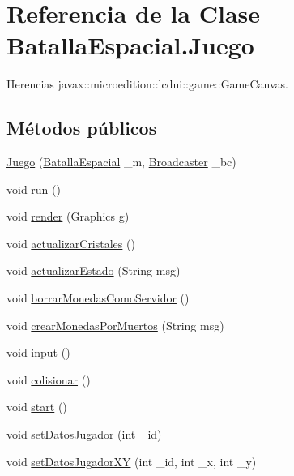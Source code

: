 \hypertarget{classBatallaEspacial_1_1Juego}{
\section{Referencia de la Clase BatallaEspacial.Juego}
\label{classBatallaEspacial_1_1Juego}
}


Herencias javax::microedition::lcdui::game::GameCanvas.

\subsection*{Métodos públicos}
\begin{DoxyCompactItemize}
\item 
\hyperlink{classBatallaEspacial_1_1Juego_aaa24d750cd2702b1a8a0fe942da7fa5e}{Juego} (\hyperlink{classBatallaEspacial_1_1BatallaEspacial}{BatallaEspacial} \_\-m, \hyperlink{classBatallaEspacial_1_1Broadcaster}{Broadcaster} \_\-bc)
\item 
void \hyperlink{classBatallaEspacial_1_1Juego_ada0d4b65fb772f1e284e9bc34d01e29a}{run} ()
\item 
void \hyperlink{classBatallaEspacial_1_1Juego_a1117da461713e965c2fab1b899900f33}{render} (Graphics g)
\item 
void \hyperlink{classBatallaEspacial_1_1Juego_a4b603f4c903e3dedda9e82893dec9c4b}{actualizarCristales} ()
\item 
void \hyperlink{classBatallaEspacial_1_1Juego_a8c738255f12bb1667d8e7ed3cb85f8f3}{actualizarEstado} (String msg)
\item 
void \hyperlink{classBatallaEspacial_1_1Juego_ae25c894354f4b68d954c0bfe7b0f6140}{borrarMonedasComoServidor} ()
\item 
void \hyperlink{classBatallaEspacial_1_1Juego_ad83daebeb9d0415474f60b98fe107631}{crearMonedasPorMuertos} (String msg)
\item 
void \hyperlink{classBatallaEspacial_1_1Juego_a89aba17b3540c558097299146f1c8c2c}{input} ()
\item 
void \hyperlink{classBatallaEspacial_1_1Juego_ab62b36bb44271e26e869868219344263}{colisionar} ()
\item 
void \hyperlink{classBatallaEspacial_1_1Juego_a304817b212deb17c27afb95c70efa7fd}{start} ()
\item 
void \hyperlink{classBatallaEspacial_1_1Juego_a49a337746fb7c43c4a0f8d487077f619}{setDatosJugador} (int \_\-id)
\item 
void \hyperlink{classBatallaEspacial_1_1Juego_af15c761f6e2b48615078cb51d2c17216}{setDatosJugadorXY} (int \_\-id, int \_\-x, int \_\-y)

\end{DoxyCompactItemize}
